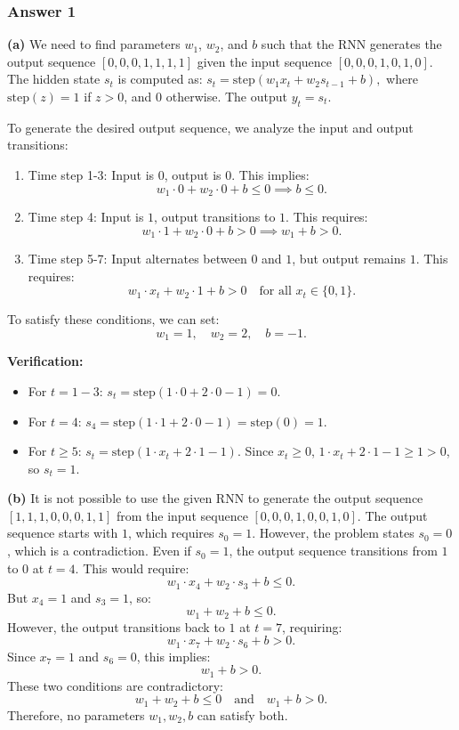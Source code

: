 \subsubsection*{Answer 1}
\textbf{(a)}
We need to find parameters \(w_1\), \(w_2\), and \(b\) such that the RNN generates the output sequence \([0, 0, 0, 1, 1, 1, 1]\) given the input sequence \([0, 0, 0, 1, 0, 1, 0]\).
The hidden state \(s_t\) is computed as:
$
s_t = \text{step}(w_1 x_t + w_2 s_{t-1} + b),
$
where \(\text{step}(z) = 1\) if \(z > 0\), and \(0\) otherwise. 
The output \(y_t = s_t\).

To generate the desired output sequence, we analyze the input and output transitions:
\begin{enumerate}
   \item Time step 1-3: Input is \(0\), output is \(0\). This implies:
   \[
   w_1 \cdot 0 + w_2 \cdot 0 + b \leq 0 \implies b \leq 0.
   \]

   \item Time step 4: Input is \(1\), output transitions to \(1\). This requires:
   \[
   w_1 \cdot 1 + w_2 \cdot 0 + b > 0 \implies w_1 + b > 0.
   \]

   \item Time step 5-7: Input alternates between \(0\) and \(1\), but output remains \(1\). This requires:
   \[
   w_1 \cdot x_t + w_2 \cdot 1 + b > 0 \quad \text{for all } x_t \in \{0, 1\}.
   \]
\end{enumerate}

To satisfy these conditions, we can set:
\[
w_1 = 1, \quad w_2 = 2, \quad b = -1.
\]

\textbf{Verification:}

   \begin{itemize}
      \item For \(t = 1-3\): \(s_t = \text{step}(1 \cdot 0 + 2 \cdot 0 - 1) = 0\).

      \item For \(t = 4\): \(s_4 = \text{step}(1 \cdot 1 + 2 \cdot 0 - 1) = \text{step}(0) = 1\).

      \item For \(t \geq 5\): \(s_t = \text{step}(1 \cdot x_t + 2 \cdot 1 - 1)\). Since \(x_t \geq 0\), \(1 \cdot x_t + 2 \cdot 1 - 1 \geq 1 > 0\), so \(s_t = 1\).
   \end{itemize}

\textbf{(b)} 
It is not possible to use the given RNN to generate the output sequence \([1, 1, 1, 0, 0, 0, 1, 1]\) from the input sequence \([0, 0, 0, 1, 0, 0, 1, 0]\). 
The output sequence starts with \(1\), which requires \(s_0 = 1\). However, the problem states \(s_0 = 0\), which is a contradiction.
Even if \(s_0 = 1\), the output sequence transitions from \(1\) to \(0\) at \(t=4\). This would require:
  \[
  w_1 \cdot x_4 + w_2 \cdot s_3 + b \leq 0.
  \]
  But \(x_4 = 1\) and \(s_3 = 1\), so:
  \[
  w_1 + w_2 + b \leq 0.
  \]
  However, the output transitions back to \(1\) at \(t=7\), requiring:
  \[
  w_1 \cdot x_7 + w_2 \cdot s_6 + b > 0.
  \]
  Since \(x_7 = 1\) and \(s_6 = 0\), this implies:
  \[
  w_1 + b > 0.
  \]
  These two conditions are contradictory:
  \[
  w_1 + w_2 + b \leq 0 \quad \text{and} \quad w_1 + b > 0.
  \]
  Therefore, no parameters \(w_1, w_2, b\) can satisfy both.
